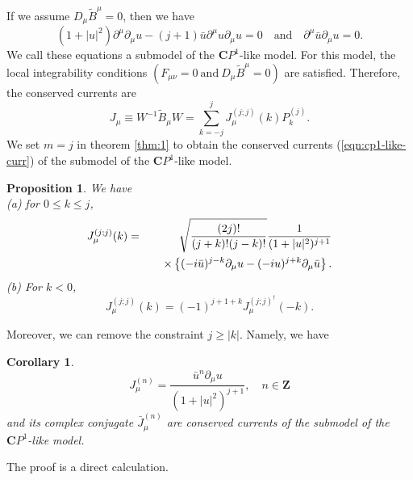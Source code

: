 \documentclass[makeidx,12pt,openany]{report}
\newtheorem{prop}[df]{Proposition}
\newtheorem{cor}[df]{Corollary}
\begin{document}
If we assume $D_{\mu}\tilde{B}^{\mu}=0$, then we have
\begin{equation}
  (1+|u|^2)\partial^{\mu}\partial_{\mu}u
        -(j+1)\bar{u}\partial^{\mu}u\partial_{\mu}u=0
  \quad \mbox{and} \quad \partial^{\mu}\bar{u}\partial_{\mu}u=0. 
\end{equation}
We call these equations a submodel of the $\mathbf{C}P^1$-like model. 
For this model, the local integrability conditions 
$( F_{\mu \nu}=0 \ \mbox{and} \ D_{\mu}\tilde{B}^{\mu}=0 )$ are satisfied. 
Therefore, the conserved currents are
\begin{equation}
 J_{\mu} \equiv W^{-1} \tilde{B}_{\mu} W
   =\sum_{k=-j}^{j} J_{\mu}^{(j;j)}(k)P_k^{(j)}. 
  \label{eqn:cp1-like-curr}
\end{equation}
We set $m=j$ in theorem \ref{thm:1} to obtain the conserved currents 
(\ref{eqn:cp1-like-curr}) of the submodel of the $\mathbf{C}P^1$-like model.
\begin{prop} We have \\
(a) for $0 \le k \le j$, 
 \begin{eqnarray}
   J_{\mu}^{(j;j)}(k) &=&
    \sqrt{\frac{(2j)!}{(j+k)!(j-k)!}}
    \frac{1}{(1+|u|^2)^{j+1}} \nonumber\\
  && \hspace{4mm} \times
   \left\{  
    (-i\bar{u})^{j-k} \partial_{\mu} u 
       -(-iu)^{j+k} \partial_{\mu}\bar{u}
   \right\} .
  \label{eqn:j23} 
 \end{eqnarray}
(b) For $k < 0$,
\begin{equation}
  J_{\mu}^{(j;j)}(k)=(-1)^{j+1+k} J_{\mu}^{(j;j)^{\dag}}(-k). 
 \label{eqn:j24}
\end{equation}
\end{prop}
Moreover, we can remove the constraint $j \geq |k|$. Namely, we have
\begin{cor}
 \begin{equation}
  J_{\mu}^{(n)}=\frac{\bar{u}^n \partial_{\mu}u}{(1+|u|^2)^{j+1}},
   \quad n \in \mathbf{Z}
 \end{equation}
and its complex conjugate $\bar{J}_{\mu}^{(n)}$ are conserved currents 
of the submodel of the $\mathbf{C}P^1$-like model. 
\end{cor}
The proof is a direct calculation. 
\end{document}
